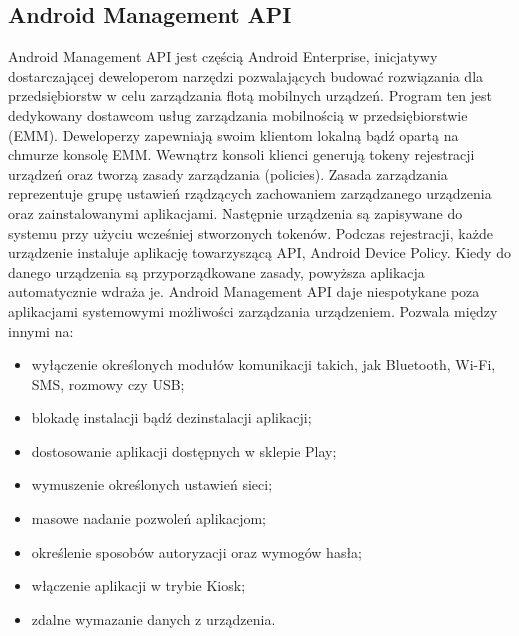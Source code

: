\subsection{Android Management API}
Android Management API jest częścią Android Enterprise, inicjatywy dostarczającej deweloperom narzędzi pozwalających budować rozwiązania dla przedsiębiorstw w celu zarządzania flotą mobilnych urządzeń\cite{AM-API}. Program ten jest dedykowany dostawcom usług zarządzania mobilnością w przedsiębiorstwie (EMM). Deweloperzy zapewniają swoim klientom lokalną bądź opartą na chmurze konsolę EMM. Wewnątrz konsoli klienci generują tokeny rejestracji urządzeń oraz tworzą zasady zarządzania (policies). Zasada zarządzania reprezentuje grupę ustawień rządzących zachowaniem zarządzanego urządzenia oraz zainstalowanymi aplikacjami. Następnie urządzenia są zapisywane do systemu przy użyciu wcześniej stworzonych tokenów. Podczas rejestracji, każde urządzenie instaluje aplikację towarzyszącą API, Android Device Policy. Kiedy do danego urządzenia są przyporządkowane zasady, powyższa aplikacja automatycznie wdraża je.
\newline\newline
\indent Android Management API daje niespotykane poza aplikacjami systemowymi możliwości
zarządzania urządzeniem. Pozwala między innymi na:
\begin{itemize}
    \item wyłączenie określonych modułów komunikacji takich, jak Bluetooth, Wi-Fi, SMS, rozmowy czy USB;
    \item blokadę instalacji bądź dezinstalacji aplikacji;
    \item dostosowanie aplikacji dostępnych w sklepie Play;
    \item wymuszenie określonych ustawień sieci;
    \item masowe nadanie pozwoleń aplikacjom;
    \item określenie sposobów autoryzacji oraz wymogów hasła;
    \item włączenie aplikacji w trybie Kiosk;
    \item zdalne wymazanie danych z urządzenia\cite{AM-Policies}.
\end{itemize}

